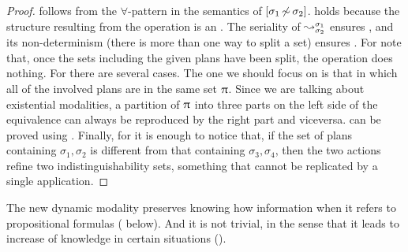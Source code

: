 \begin{proof}
 follows from the $\forall$-pattern in the semantics of $[{\sigma_1{\,\not\sim\,}\sigma_2}]$.
 holds because the structure resulting from the operation is an \ults.
The seriality of $\leadsto^{\sigma_1}_{\sigma_2}$ ensures , and its non-determinism (there is more than one way to split a set) ensures .
For  note that, once the sets including the given plans have been split, the operation does nothing. %
For  there are several cases. The one we should focus on is that in which all of the involved plans are in the same set $\uppi$. Since we are talking about existential modalities, a partition of $\uppi$ into three parts on the left side of the equivalence can always be reproduced by the right part and viceversa. %
 can be proved using . Finally, for  it is enough to notice that, if the set of plans containing $\sigma_1, \sigma_2$ is different from that containing $\sigma_3, \sigma_4$, then the two actions refine two indistinguishability sets, something that cannot be replicated by a single application.
\end{proof}

The new dynamic modality preserves knowing how information when it refers to propositional formulas ( below).  And it is not trivial, in the sense that it leads to increase of knowledge in certain situations ().

\medskip

